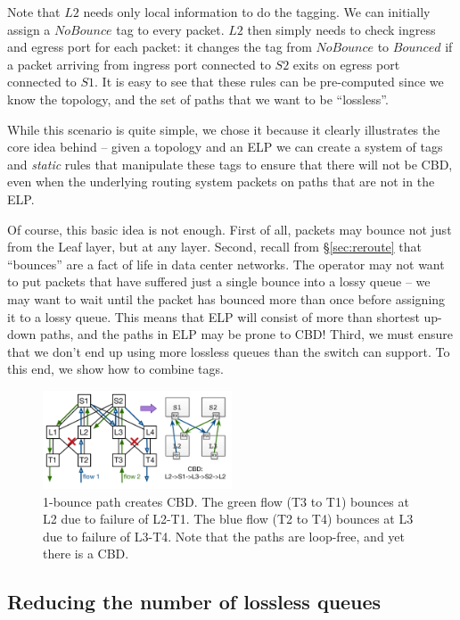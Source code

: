 Note that $L2$ needs only local information to do the tagging. We can initially
assign a $NoBounce$ tag to every packet. $L2$ then simply needs to check ingress
and egress port for each packet: it changes the tag from $NoBounce$ to $Bounced$
if a packet arriving from ingress port connected to $S2$ exits on egress port
connected to $S1$.  It is easy to see that these rules can be pre-computed since
we know the topology, and the set of  paths that we want to be ``lossless''.

While this scenario is quite simple, we chose it because it clearly illustrates
the core idea behind \sysname{} -- given a topology and an ELP we can create a
system of tags and {\em static} rules that manipulate these tags to ensure that
there will not be CBD, even when the underlying routing system packets on paths
that are not in the ELP.

Of course, this basic idea is not enough. First of all, packets may bounce not
just from the Leaf layer, but at any layer. Second, recall from
\S\ref{sec:reroute} that ``bounces'' are a fact of life in data center networks.
The operator may not want to put packets that have suffered just a single bounce
into a lossy queue -- we may want to wait until the packet has bounced more than
once before assigning it to a lossy queue. This means that ELP will consist
of more than shortest up-down paths, and the paths in ELP may be prone to CBD!
Third, we must ensure that we don't end up using more lossless queues than the
switch can support. To this end, we show how to combine tags.

\begin{figure}[t]
	\centering
	\includegraphics[width=0.5\textwidth] {figs/cbd_a}
		\caption{1-bounce path creates CBD. The green flow (T3 to T1) bounces at L2 due to failure
		of L2-T1. The blue flow (T2 to T4) bounces at L3 due to failure of
		L3-T4. Note that the paths are loop-free, and yet there is a CBD.}
	\vspace{-1em}
	\label{fig:clos_1_bounce}
\end{figure}

\subsection{Reducing the number of lossless queues}
\label{subsec:combine}

